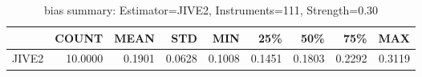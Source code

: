\begin{table}[ht]
\centering
\caption{bias summary: Estimator=JIVE2, Instruments=111, Strength=0.30}
\begin{tabular}{lrrrrrrrr}
\toprule
 & COUNT & MEAN & STD & MIN & 25\% & 50\% & 75\% & MAX \\
\midrule
JIVE2 & 10.0000 & 0.1901 & 0.0628 & 0.1008 & 0.1451 & 0.1803 & 0.2292 & 0.3119 \\
\bottomrule
\end{tabular}
\end{table}
